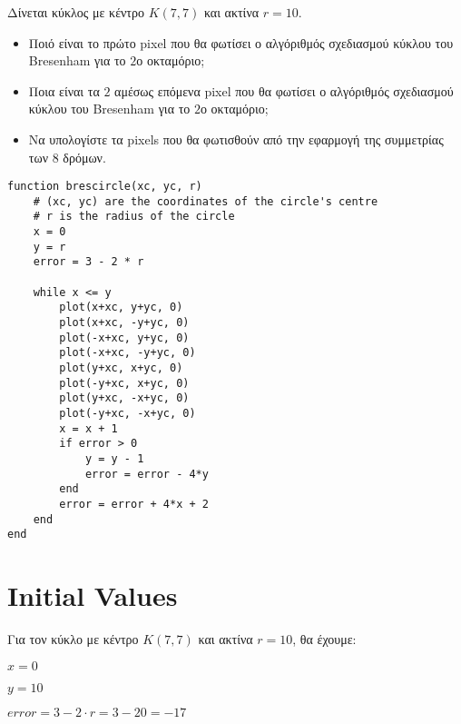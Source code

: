 \begin{exercise}
	Δίνεται κύκλος με κέντρο $Κ(7,7)$ και ακτίνα $r = 10$. 
	\begin{itemize}
	  \item Ποιό είναι το πρώτο pixel που θα φωτίσει ο αλγόριθμός σχεδιασμού κύκλου του Bresenham για το $2$ο οκταμόριο;
	  \item Ποια είναι τα $2$ αμέσως επόμενα pixel που θα φωτίσει ο αλγόριθμός σχεδιασμού κύκλου του Bresenham για το $2$ο οκταμόριο;
	  \item Να υπολογίστε  τα pixels που θα φωτισθούν από την εφαρμογή της συμμετρίας των $8$ δρόμων.
	\end{itemize}
\end{exercise}


\begin{solution}
	

\begin{lstlisting}[caption={Αλγόριθμος του Bresenham για σχεδιασμό κύκλου}]
function brescircle(xc, yc, r)
    # (xc, yc) are the coordinates of the circle's centre
    # r is the radius of the circle
    x = 0 
    y = r
    error = 3 - 2 * r
    
    while x <= y
        plot(x+xc, y+yc, 0)
        plot(x+xc, -y+yc, 0) 
        plot(-x+xc, y+yc, 0) 
        plot(-x+xc, -y+yc, 0) 
        plot(y+xc, x+yc, 0) 
        plot(-y+xc, x+yc, 0)
        plot(y+xc, -x+yc, 0) 
        plot(-y+xc, -x+yc, 0) 
        x = x + 1
        if error > 0
            y = y - 1
            error = error - 4*y
        end
        error = error + 4*x + 2
    end
end
\end{lstlisting}

\section*{Initial Values}

Για τον κύκλο με κέντρο \( K(7, 7) \) και ακτίνα \( r = 10 \), θα έχουμε:

\begin{itemize}[noitemsep, topsep=0pt] %
\begin{multicols}{2} %
  \item \( x = 0 \)
  \item \( y = 10 \)
  \item \( error = 3 - 2 \cdot r = 3 - 20 = -17 \)
\end{multicols}
\end{itemize}


\end{solution}

